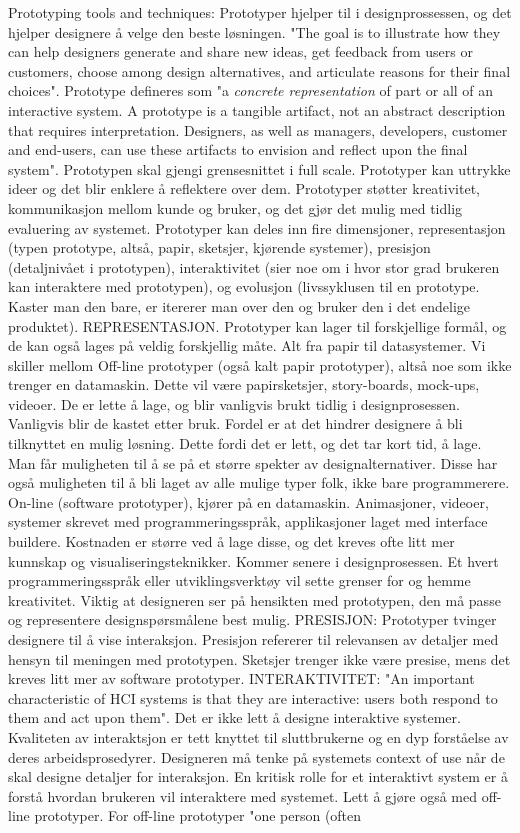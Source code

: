 Prototyping tools and techniques:
Prototyper hjelper til i designprossessen, og det hjelper designere å velge den beste løsningen. "The goal is to illustrate how they can help designers generate and share new ideas, get feedback from users or customers, choose among design alternatives, and articulate reasons for their final choices". Prototype defineres som "a \emph{concrete representation} of part or all of an interactive system. A prototype is a tangible artifact, not an abstract description that requires interpretation. Designers, as well as managers, developers, customer and end-users, can use these artifacts to envision and reflect upon the final system". Prototypen skal gjengi grensesnittet i full scale. Prototyper kan uttrykke ideer og det blir enklere å reflektere over dem. Prototyper støtter kreativitet, kommunikasjon mellom kunde og bruker, og det gjør det mulig med tidlig evaluering av systemet. Prototyper kan deles inn fire dimensjoner, representasjon (typen prototype, altså, papir, sketsjer, kjørende systemer), presisjon (detaljnivået i prototypen), interaktivitet (sier noe om i hvor stor grad brukeren kan interaktere med prototypen), og evolusjon (livssyklusen til en prototype. Kaster man den bare, er itererer man over den og bruker den i det endelige produktet). REPRESENTASJON. Prototyper kan lager til forskjellige formål, og de kan også lages på veldig forskjellig måte. Alt fra papir til datasystemer. Vi skiller mellom Off-line prototyper (også kalt papir prototyper), altså noe som ikke trenger en datamaskin. Dette vil være papirsketsjer, story-boards, mock-ups, videoer. De er lette å lage, og blir vanligvis brukt tidlig i designprosessen. Vanligvis blir de kastet etter bruk. Fordel er at det hindrer designere å bli tilknyttet en mulig løsning. Dette fordi det er lett, og det tar kort tid, å lage. Man får muligheten til å se på et større spekter av designalternativer. Disse har også muligheten til å bli laget av alle mulige typer folk, ikke bare programmerere. On-line (software prototyper), kjører på en datamaskin. Animasjoner, videoer, systemer skrevet med programmeringsspråk, applikasjoner laget med interface buildere. Kostnaden er større ved å lage disse, og det kreves ofte litt mer kunnskap og visualiseringsteknikker. Kommer senere i designprosessen. Et hvert programmeringsspråk eller utviklingsverktøy vil sette grenser for og hemme kreativitet. Viktig at designeren ser på hensikten med prototypen, den må passe og representere designspørsmålene best mulig. PRESISJON: Prototyper tvinger designere til å vise interaksjon. Presisjon refererer til relevansen av detaljer med hensyn til meningen med prototypen. Sketsjer trenger ikke være presise, mens det kreves litt mer av software prototyper. INTERAKTIVITET: "An important characteristic of HCI systems is that they are interactive: users both respond to them and act upon them". Det er ikke lett å designe interaktive systemer. Kvaliteten av interaktsjon er tett knyttet til sluttbrukerne og en dyp forståelse av deres arbeidsprosedyrer. Designeren må tenke på systemets context of use når de skal designe detaljer for interaksjon. En kritisk rolle for et interaktivt system er å forstå hvordan brukeren vil interaktere med systemet. Lett å gjøre også med off-line prototyper. For off-line prototyper "one person (often 